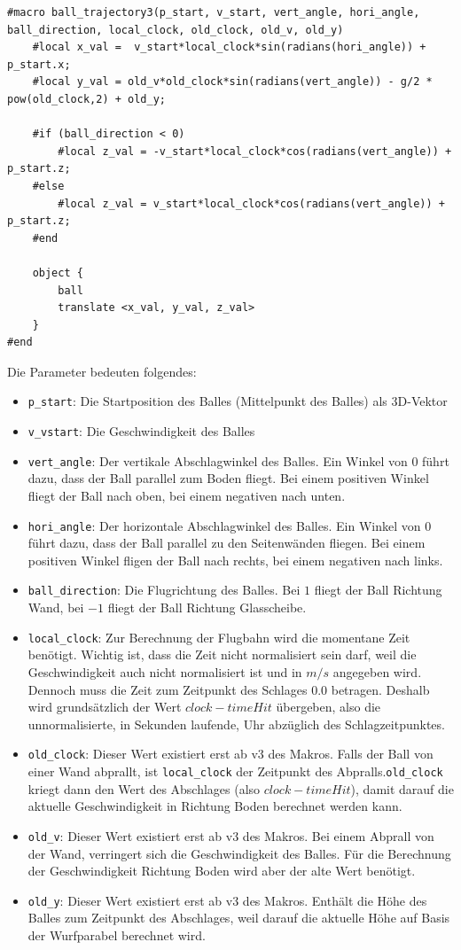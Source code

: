 \begin{lstlisting}[caption="Makro zur Generierung einer Flugbahn des Balles (verkürzt)"]
#macro ball_trajectory3(p_start, v_start, vert_angle, hori_angle, ball_direction, local_clock, old_clock, old_v, old_y)
	#local x_val =  v_start*local_clock*sin(radians(hori_angle)) + p_start.x;
	#local y_val = old_v*old_clock*sin(radians(vert_angle)) - g/2 * pow(old_clock,2) + old_y;

	#if (ball_direction < 0)
		#local z_val = -v_start*local_clock*cos(radians(vert_angle)) + p_start.z;
	#else 
		#local z_val = v_start*local_clock*cos(radians(vert_angle)) + p_start.z;
	#end

	object {
		ball
		translate <x_val, y_val, z_val>
	}
#end
\end{lstlisting}
Die Parameter bedeuten folgendes:
\begin{itemize}
	\item \texttt{p\_start}: Die Startposition des Balles (Mittelpunkt des Balles) als 3D-Vektor
	\item \texttt{v\_vstart}: Die Geschwindigkeit des Balles
	\item \texttt{vert\_angle}: Der vertikale Abschlagwinkel des Balles. Ein Winkel von 0 führt dazu, dass der Ball parallel zum Boden fliegt. Bei einem positiven Winkel fliegt der Ball nach oben, bei einem negativen nach unten.
	\item \texttt{hori\_angle}: Der horizontale Abschlagwinkel des Balles. Ein Winkel von 0 führt dazu, dass der Ball parallel zu den Seitenwänden fliegen. Bei einem positiven Winkel fligen der Ball nach rechts, bei einem negativen nach links.
	\item \texttt{ball\_direction}: Die Flugrichtung des Balles. Bei $1$ fliegt der Ball Richtung Wand, bei $-1$ fliegt der Ball Richtung Glasscheibe.
	\item \texttt{local\_clock}: Zur Berechnung der Flugbahn wird die momentane Zeit benötigt. Wichtig ist, dass die Zeit nicht normalisiert sein darf, weil die Geschwindigkeit auch nicht normalisiert ist und in $m/s$ angegeben wird. Dennoch muss die Zeit zum Zeitpunkt des Schlages $0.0$ betragen. Deshalb wird grundsätzlich der Wert $clock - timeHit$ übergeben, also die unnormalisierte, in Sekunden laufende, Uhr abzüglich des Schlagzeitpunktes.
	\item \texttt{old\_clock}: Dieser Wert existiert erst ab v3 des Makros. Falls der Ball von einer Wand abprallt, ist \texttt{local\_clock} der Zeitpunkt des Abpralls.\texttt{old\_clock} kriegt dann den Wert des Abschlages (also $clock - timeHit$), damit darauf die aktuelle Geschwindigkeit in Richtung Boden berechnet werden kann. 
	\item \texttt{old\_v}: Dieser Wert existiert erst ab v3 des Makros. Bei einem Abprall von der Wand, verringert sich die Geschwindigkeit des Balles. Für die Berechnung der Geschwindigkeit Richtung Boden wird aber der alte Wert benötigt.
	\item \texttt{old\_y}: Dieser Wert existiert erst ab v3 des Makros. Enthält die Höhe des Balles zum Zeitpunkt des Abschlages, weil darauf die aktuelle Höhe auf Basis der Wurfparabel berechnet wird.
\end{itemize}

